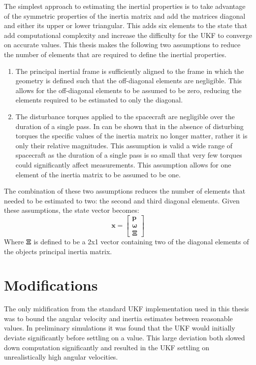The simplest approach to estimating the inertial properties is to take advantage of the symmetric properties of the inertia matrix and add the matrices diagonal and either its upper or lower triangular. This adds six elements to the state that add computational complexity and increase the difficulty for the UKF to converge on accurate values. This thesis makes the following two assumptions to reduce the number of elements that are required to define the inertial properties.
\begin{enumerate}
\item The principal inertial frame is sufficiently aligned to the frame in which the geometry is defined such that the off-diagonal elements are negligible. This allows for the off-diagonal elements to be assumed to be zero, reducing the elements required to be estimated to only the diagonal.

\item The disturbance torques applied to the spacecraft are negligible over the duration of a single pass. In can be shown that in the absence of disturbing torques the specific values of the inertia matrix no longer matter, rather it is only their relative magnitudes. This assumption is valid a wide range of spacecraft as the duration of a single pass is so small that very few torques could significantly affect measurements. This assumption allows for one element of the inertia matrix to be assumed to be one.
\end{enumerate}
The combination of these two assumptions reduces the number of elements that needed to be estimated to two: the second and third diagonal elements. Given these assumptions, the state vector becomes:
\begin{equation}
\bm{x} = \begin{bmatrix} \bm{p} \\ \bm{\omega} \\ \bm{\Xi} \end{bmatrix}
\end{equation}
Where $\bm{\Xi}$ is defined to be a 2x1 vector containing two of the diagonal elements of the objects principal inertia matrix.

\section{Modifications}

The only midification from the standard UKF implementation used in this thesis was to bound the angular velocity and inertia estimates between reasonable values. In preliminary simulations it was found that the UKF would initially deviate significantly before settling on a value. This large deviation both slowed down computation significantly and resulted in the UKF settling on unrealistically high angular velocities.